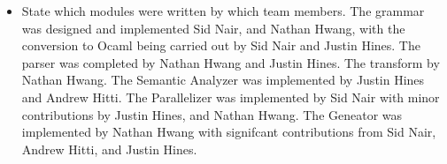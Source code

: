 \begin{itemize}
\item State which modules were written by which team members.
The grammar was designed and implemented Sid Nair, and Nathan Hwang, with the
conversion to Ocaml being carried out by Sid Nair and Justin Hines.  The parser was
completed by Nathan Hwang and Justin Hines.  The transform by Nathan Hwang.  The
Semantic Analyzer was implemented by Justin Hines and Andrew Hitti.  The Parallelizer was
implemented by Sid Nair with minor contributions by Justin Hines, and Nathan Hwang. 
The Geneator was implemented by Nathan Hwang with signifcant contributions from 
Sid Nair, Andrew Hitti, and Justin Hines.

\end{itemize}




